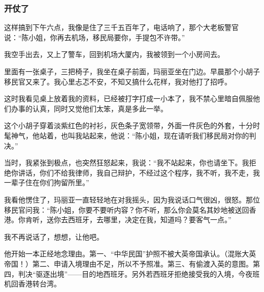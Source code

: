 \subsubsection*{开仗了}
\par 这样搞到下午六点，我像是住了三千五百年了，电话响了，那个大老板警官说：“陈小姐，你再去机场，移民局要你，手提包不许带。”
\par 我空手出去，又上了警车，回到机场大厦内，我被领到一个小房间去。
\par 里面有一张桌子，三把椅子，我坐在桌子前面，玛丽亚坐在门边。早晨那个小胡子移民官又来了。我心里忐忑不安，不知又搞什么花样，我对他打了招呼。
\par 这时我看见桌上放着我的资料，已经被打字打成一小本了，我不禁心里暗自佩服他们办事的认真，同时又觉他们太笨，真是多此一举。
\par 这个小胡子穿着淡紫红色的衬衫，灰色条子宽领带，外面一件灰色的外套，十分时髦神气，他站着，也叫我站起来，他说：“陈小姐，现在请听我们移民局对你的判决。”
\par 当时，我紧张到极点，也突然狂怒起来，我说：“我不站起来，你也请坐下。我拒绝你讲话，你们不给我律师，我自己辩护，不经过这个程序，我不听，我不走，我一辈子住在你们拘留所里。”
\par 我看他愣住了，玛丽亚一直轻轻地在对我摇头，因为我说话口气很凶，很怒。那位移民官问我：“陈小姐，你要不要听内容？你不听，那么你会莫名其妙地被送回香港。你肯听，送你去西班牙，去哪里，决定在我，知道吗？要客气一点。”
\par 我不再说话了，想想，让他吧。
\par 他开始一本正经地念理由。第一、“中华民国”护照不被大英帝国承认。（混账大英帝国！）第二、申请入境理由不足，所以不予照准。第三、有偷渡入英的意图。第四，判决“驱逐出境”——目的地西班牙。另外若西班牙拒绝接受我的入境，今夜班机回香港转台湾。
